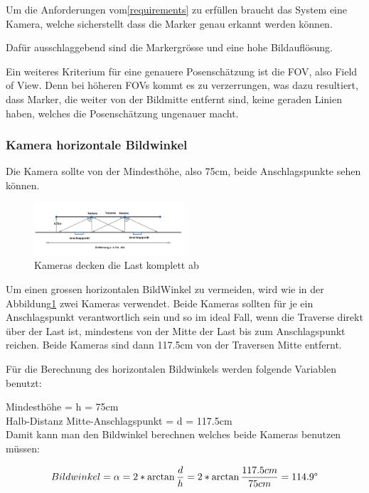 Um die Anforderungen vom\ref{requirements} zu erfüllen braucht das System eine Kamera, welche sicherstellt dass die Marker genau erkannt werden können.

Dafür ausschlaggebend sind die Markergrösse und eine hohe Bildauflösung\cite{noauthor_designing_2020}. 

Ein weiteres Kriterium für eine genauere Posenschätzung ist die FOV, also Field of View. 
Denn bei höheren FOVs kommt es zu verzerrungen, was dazu resultiert, dass Marker, die weiter von der Bildmitte entfernt sind, keine geraden Linien haben, welches die Posenschätzung ungenauer macht.


\subsubsection{Kamera horizontale Bildwinkel}

Die Kamera sollte von der Mindesthöhe, also 75cm, beide Anschlagspunkte sehen können.

\begin{figure}[H]
    \centering
    \includegraphics[width=0.5\textwidth]{graphics/KameraFOV.png}\hfill%
    \caption{Kameras decken die Last komplett ab}
    \label{fig:FOV}
\end{figure}

Um einen grossen horizontalen BildWinkel zu vermeiden, wird wie in der Abbildung\ref{fig:FOV} zwei Kameras verwendet. 
Beide Kameras sollten für je ein Anschlagspunkt verantwortlich sein und so im ideal Fall, wenn die Traverse direkt über der Last ist, mindestens von der Mitte der Last bis zum Anschlagspunkt reichen.
Beide Kameras sind dann 117.5cm von der Traversen Mitte entfernt.

Für die Berechnung des horizontalen Bildwinkels werden folgende Variablen benutzt:

Mindesthöhe = h = 75cm\\
Halb-Distanz Mitte-Anschlagspunkt = d = 117.5cm\\

Damit kann man den Bildwinkel berechnen welches beide Kameras benutzen müssen:

\begin{equation}
    Bildwinkel = \alpha = 2*\arctan\frac{d}{h} = 2*\arctan\frac{117.5cm}{75cm} = 114.9\degree
    \label{eq:FOV}
\end{equation}


